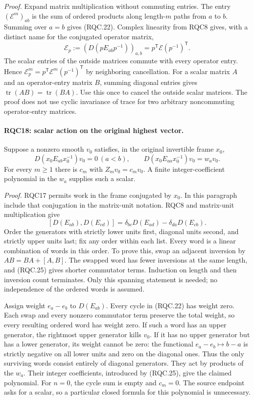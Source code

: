 \documentclass[11pt,a4paper]{article}
\numberwithin{equation}{section}
\theoremstyle{remark}\newtheorem{remark}[theorem]{Remark}
\begin{document}
\emph{Proof.}
Expand matrix multiplication without commuting entries.
The entry \((\mathcal E^m)_{ab}\) is the sum of ordered products
along length-\(m\) paths from \(a\) to \(b\).  Summing over
\(a=b\) gives (RQC.22).
Complex linearity from RQC8 gives, with a distinct name for the
conjugated operator matrix,
\[
 \mathcal E_p:=(D(pE_{ab}p^{-1}))_{a,b}
    =p^{\mathsf T}\mathcal E(p^{-1})^{\mathsf T}.
 \tag{RQC.23}
\]
The scalar entries of the outside matrices commute with every
operator entry.  Hence
\(\mathcal E_p^m=p^{\mathsf T}\mathcal E^m(p^{-1})^{\mathsf T}\)
by neighboring cancellation.
For a scalar matrix \(A\) and an operator-entry matrix \(B\),
summing diagonal entries gives
\(\operatorname{tr}(AB)=\operatorname{tr}(BA)\).
Use this once to cancel the outside scalar matrices.
The proof does not use cyclic invariance of trace for two
arbitrary noncommuting operator-entry matrices.

\paragraph{RQC18: scalar action on the original highest vector.}
\label{claim:RQC18}
Suppose a nonzero smooth \(v_0\) satisfies, in the original
invertible frame \(x_0\),
\[
 D(x_0E_{ab}x_0^{-1})v_0=0\ (a<b),\qquad
 D(x_0E_{aa}x_0^{-1})v_0=w_av_0.
 \tag{RQC.24}
\]
For every \(m\ge1\) there is \(c_m\) with \(Z_mv_0=c_mv_0\).
A finite integer-coefficient polynomial in the \(w_a\) supplies
such a scalar.

\emph{Proof.}
RQC17 permits work in the frame conjugated by \(x_0\).
In this paragraph include that conjugation in the matrix-unit
notation.  RQC8 and matrix-unit multiplication give
\[
 [D(E_{ab}),D(E_{cd})]
   =\delta_{bc}D(E_{ad})-\delta_{da}D(E_{cb}).
 \tag{RQC.25}
\]
Order the generators with strictly lower units first, diagonal
units second, and strictly upper units last; fix any order within
each list.  Every word is a linear combination of words in this
order.  To prove this, swap an adjacent inversion by
\(AB=BA+[A,B]\).  The swapped word has fewer inversions at the
same length, and (RQC.25) gives shorter commutator terms.
Induction on length and then inversion count terminates.
Only this spanning statement is needed; no independence of the
ordered words is assumed.

Assign weight \(e_a-e_b\) to \(D(E_{ab})\).
Every cycle in (RQC.22) has weight zero.  Each swap and every
nonzero commutator term preserve the total weight, so every
resulting ordered word has weight zero.
If such a word has an upper generator, the rightmost upper
generator kills \(v_0\).
If it has no upper generator but has a lower generator, its weight
cannot be zero: the functional
\(e_a-e_b\mapsto b-a\) is strictly negative on all lower units
and zero on the diagonal ones.
Thus the only surviving words consist entirely of diagonal
generators.  They act by products of the \(w_a\).
Their integer coefficients, introduced by (RQC.25), give the
claimed polynomial.  For \(n=0\), the cycle sum is empty and
\(c_m=0\).  The source endpoint asks for a scalar, so a particular
closed formula for this polynomial is unnecessary.
\end{document}
